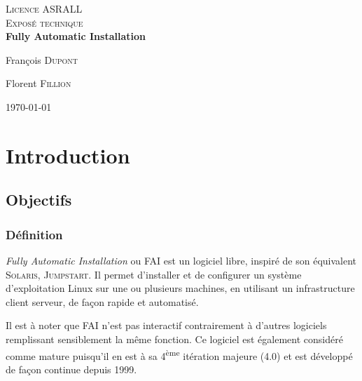 \documentclass[a4paper,12pt,one side,titlepage]{report}
\begin{document}
%
%


\begin{titlepage}
\begin{center}

\textsc{\LARGE Licence ASRALL}\\[1.5cm]

\textsc{\Large Exposé technique}\\[5.9cm]

{ \huge \bfseries Fully Automatic Installation\\[1.9cm] }

\noindent
\begin{minipage}{0.4\textwidth}
\begin{flushleft} \large
François \textsc{Dupont}
\end{flushleft}
\end{minipage}%
\begin{minipage}{0.4\textwidth}
\begin{flushright} \large
Florent \textsc{Fillion}
\end{flushright}
\end{minipage}

\vfill

{\large \today}

\end{center}
\end{titlepage}


\tableofcontents

\chapter{Introduction}
\section{Objectifs}
\subsection{Définition}
\textit{Fully Automatic Installation} ou \textsc{FAI} est un logiciel libre, inspiré de son équivalent \textsc{Solaris}, \textsc{Jumpstart}. Il permet d'installer et de configurer un système d'exploitation Linux sur une ou plusieurs machines, en utilisant un infrastructure client serveur, de façon rapide et automatisé.

Il est à noter que \textsc{FAI} n'est pas interactif contrairement à d'autres logiciels remplissant sensiblement la même fonction. Ce logiciel est également considéré comme mature puisqu'il en est à sa 4\textsuperscript{ème} itération majeure (4.0) et est développé de façon continue depuis 1999.
\end{document}
